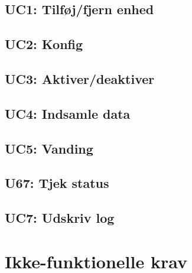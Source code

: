 %


\subsection{UC1: Tilføj/fjern enhed}



\subsection{UC2: Konfig}



\subsection{UC3: Aktiver/deaktiver}



\subsection{UC4: Indsamle data}



\subsection{UC5: Vanding}




\subsection{U67: Tjek status}



\subsection{UC7: Udskriv log}



\section{Ikke-funktionelle krav}
